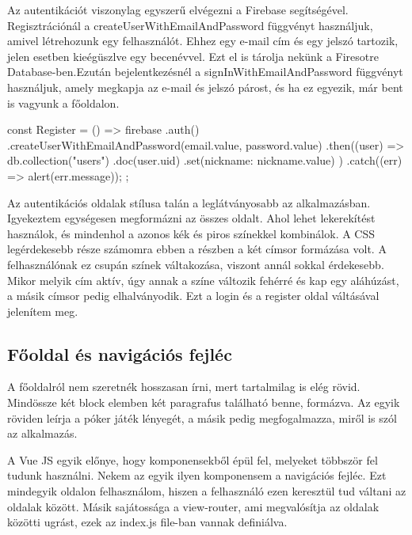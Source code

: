 Az autentikációt viszonylag egyszerű elvégezni a Firebase segítségével. Regisztrációnál a createUserWithEmailAndPassword függvényt használjuk, amivel létrehozunk egy felhasználót. Ehhez egy e-mail cím és egy jelszó tartozik, jelen esetben kieégüszlve egy becenévvel. Ezt el is tárolja nekünk a Firesotre Database-ben.Ezután bejelentkezésnél a signInWithEmailAndPassword függvényt használjuk, amely megkapja az e-mail és jelszó párost, és ha ez egyezik, már bent is vagyunk a főoldalon.

\begin{python}
const Register = () => {
      firebase
        .auth()
        .createUserWithEmailAndPassword(email.value, password.value)
        .then((user) => {
          db.collection("users")
            .doc(user.uid)
            .set({nickname: nickname.value})
        })
        .catch((err) => alert(err.message));
    };
\end{python}

Az autentikációs oldalak stílusa talán a leglátványosabb az alkalmazásban. Igyekeztem egységesen megformázni az összes oldalt. Ahol lehet lekerekítést használok, és mindenhol a azonos kék és piros színekkel kombinálok. A CSS legérdekesebb része számomra ebben a részben a két címsor formázása volt. A felhasználónak ez csupán színek váltakozása, viszont annál sokkal érdekesebb. Mikor melyik cím aktív, úgy annak a színe változik fehérré és kap egy aláhúzást, a másik címsor pedig elhalványodik. Ezt a login és a register oldal váltásával jelenítem meg.


\subsection{Főoldal és navigációs fejléc}
A főoldalról nem szeretnék hosszasan írni, mert tartalmilag is elég rövid. Mindössze két block elemben két paragrafus található benne, formázva. Az egyik röviden leírja a póker játék lényegét, a másik pedig megfogalmazza, miről is szól az alkalmazás.

A Vue JS egyik előnye, hogy komponensekből épül fel, melyeket többször fel tudunk használni. Nekem az egyik ilyen komponensem a navigációs fejléc. Ezt mindegyik oldalon felhasználom, hiszen a felhasználó ezen keresztül tud váltani az oldalak között. Másik sajátossága a view-router, ami megvalósítja az oldalak közötti ugrást, ezek az index.js file-ban vannak definiálva.

